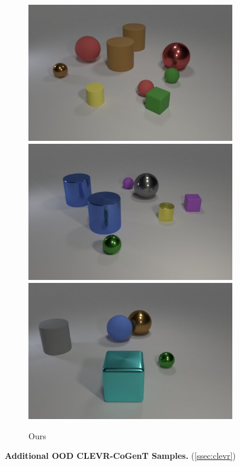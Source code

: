 \begin{figure}
\begin{subfigure}{.3225\linewidth}
\includegraphics[width=\linewidth]{figures/clevr/output/5.jpg}\\
\includegraphics[width=\linewidth]{figures/clevr/output/6.jpg}\\
\includegraphics[width=\linewidth]{figures/clevr/output/7.jpg}
\caption{Ours}
\end{subfigure}
\caption{\textbf{Additional OOD CLEVR-CoGenT Samples.} (\cref{ssec:clevr})}
\label{fig:clevr_samples_additional}
\end{figure}
